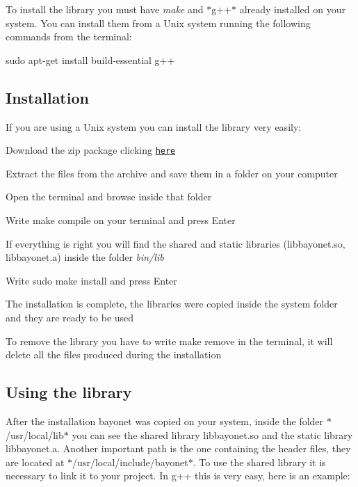 To install the library you must have {\itshape make} and $\ast$g++$\ast$ already installed on your system. You can install them from a Unix system running the following commands from the terminal\-:

{\ttfamily sudo apt-\/get install build-\/essential g++}

\subsection*{Installation }

If you are using a Unix system you can install the library very easily\-:


\begin{DoxyEnumerate}
\item Download the zip package clicking \href{https://github.com/mpatacchiola/bayonet/archive/master.zip}{\tt here}
\item Extract the files from the archive and save them in a folder on your computer
\item Open the terminal and browse inside that folder
\item Write {\ttfamily make compile} on your terminal and press Enter
\item If everything is right you will find the shared and static libraries (libbayonet.\-so, libbayonet.\-a) inside the folder {\itshape bin/lib}
\item Write {\ttfamily sudo make install} and press Enter
\item The installation is complete, the libraries were copied inside the system folder and they are ready to be used
\item To remove the library you have to write {\ttfamily make remove} in the terminal, it will delete all the files produced during the installation
\end{DoxyEnumerate}

\subsection*{Using the library }

After the installation bayonet was copied on your system, inside the folder $\ast$/usr/local/lib$\ast$ you can see the shared library libbayonet.\-so and the static library libbayonet.\-a. Another important path is the one containing the header files, they are located at $\ast$/usr/local/include/bayonet$\ast$. To use the shared library it is necessary to link it to your project. In g++ this is very easy, here is an example\-:

